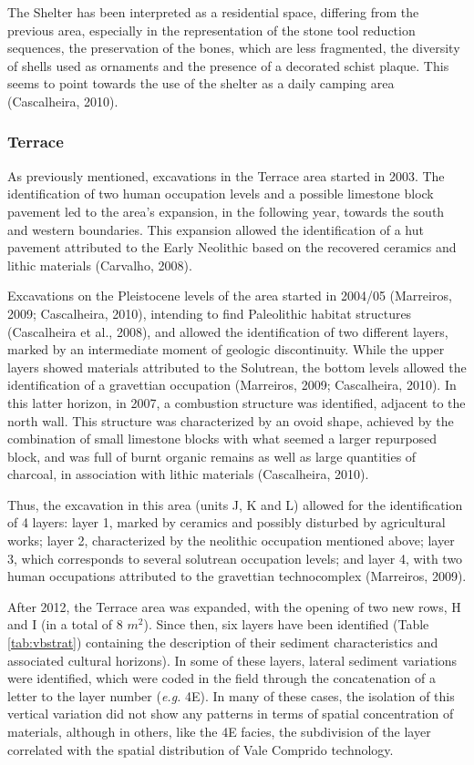 \documentclass[12pt,twoside]{reedthesis}
\begin{document}
The Shelter has been interpreted as a residential space, differing from the previous area, especially in the representation of the stone tool reduction sequences, the preservation of the bones, which are less fragmented, the diversity of shells used as ornaments and the presence of a decorated schist plaque. This seems to point towards the use of the shelter as a daily camping area (Cascalheira, 2010).

\hypertarget{terrace}{%
\subsubsection{Terrace}\label{terrace}}

As previously mentioned, excavations in the Terrace area started in 2003. The identification of two human occupation levels and a possible limestone block pavement led to the area's expansion, in the following year, towards the south and western boundaries. This expansion allowed the identification of a hut pavement attributed to the Early Neolithic based on the recovered ceramics and lithic materials (Carvalho, 2008).

Excavations on the Pleistocene levels of the area started in 2004/05 (Marreiros, 2009; Cascalheira, 2010), intending to find Paleolithic habitat structures (Cascalheira et al., 2008), and allowed the identification of two different layers, marked by an intermediate moment of geologic discontinuity. While the upper layers showed materials attributed to the Solutrean, the bottom levels allowed the identification of a gravettian occupation (Marreiros, 2009; Cascalheira, 2010). In this latter horizon, in 2007, a combustion structure was identified, adjacent to the north wall. This structure was characterized by an ovoid shape, achieved by the combination of small limestone blocks with what seemed a larger repurposed block, and was full of burnt organic remains as well as large quantities of charcoal, in association with lithic materials (Cascalheira, 2010).

Thus, the excavation in this area (units J, K and L) allowed for the identification of 4 layers: layer 1, marked by ceramics and possibly disturbed by agricultural works; layer 2, characterized by the neolithic occupation mentioned above; layer 3, which corresponds to several solutrean occupation levels; and layer 4, with two human occupations attributed to the gravettian technocomplex (Marreiros, 2009).

After 2012, the Terrace area was expanded, with the opening of two new rows, H and I (in a total of 8 \(m^2\)). Since then, six layers have been identified (Table \ref{tab:vbstrat}) containing the description of their sediment characteristics and associated cultural horizons). In some of these layers, lateral sediment variations were identified, which were coded in the field through the concatenation of a letter to the layer number (\emph{e.g.} 4E). In many of these cases, the isolation of this vertical variation did not show any patterns in terms of spatial concentration of materials, although in others, like the 4E facies, the subdivision of the layer correlated with the spatial distribution of Vale Comprido technology.
\end{document}

